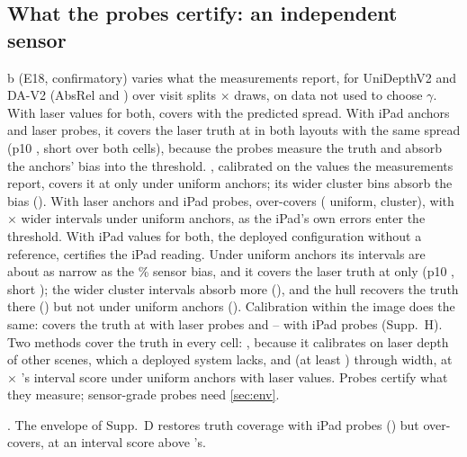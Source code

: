 \subsection{What the probes certify: an independent sensor}
\label{sec:res:sensor}
b (E18, confirmatory) varies what the measurements report, for UniDepthV2 and DA-V2 (AbsRel \NumArkUniAbsRel{} and \NumArkDavAbsRel) over \NumReplSplits{} visit splits $\times$ \NumProbeDraws{} draws, on data not used to choose $\gamma$.
With laser values for both, \mDual covers \NumEEighteenCovLL{} with the predicted spread.
With iPad anchors and laser probes, it covers the laser truth at \NumEEighteenCovIL{} in both layouts with the same spread (p10 \NumEEighteenPTen, short \NumEEighteenShort{} over both cells), because the probes measure the truth and absorb the anchors' bias into the threshold.
\mDistSplit, calibrated on the values the measurements report, covers it at only \NumEEighteenDistIpad{} under uniform anchors; its wider cluster bins absorb the bias (\NumEEighteenDistIpadCluster).
With laser anchors and iPad probes, \mDual over-covers (\NumEEighteenCovLI{} uniform, \NumEEighteenCovLICluster{} cluster), with \NumEEighteenWiden$\times$ wider intervals under uniform anchors, as the iPad's own errors enter the threshold.
With iPad values for both, the deployed configuration without a reference, \mDual certifies the iPad reading.
Under uniform anchors its intervals are about as narrow as the \NumArkIpadOffset\% sensor bias, and it covers the laser truth at only \NumEEighteenCovII{} (p10 \NumEEighteenPTenII, short \NumEEighteenShortII); the wider cluster intervals absorb more (\NumEEighteenCovIICluster), and the hull \mDualBoth recovers the truth there (\NumEEighteenHullIICluster) but not under uniform anchors (\NumEEighteenHullII).
Calibration within the image does the same: \mLocalSplit covers the truth at \NumEEighteenLocalSplitLaserLo{} with laser probes and \NumEEighteenLocalSplitIpadLo--\NumEEighteenLocalSplitIpadHi{} with iPad probes (Supp.~H).
Two methods cover the truth in every cell: \mSplitCP, because it calibrates on laser depth of other scenes, which a deployed system lacks, and \mDistBoth (at least \NumEEighteenDistBothMin) through width, at \NumEEighteenDistBothRatio$\times$ \mDual's interval score under uniform anchors with laser values.
Probes certify what they measure\ifenvelopemain; sensor-grade probes need \cref{sec:env}.

\else.
The envelope of Supp.~D restores truth coverage with iPad probes (\NumEnvTruthCov) but over-covers, at an interval score \NumEnvISWorse{} above \mDistBoth's.
\fi
